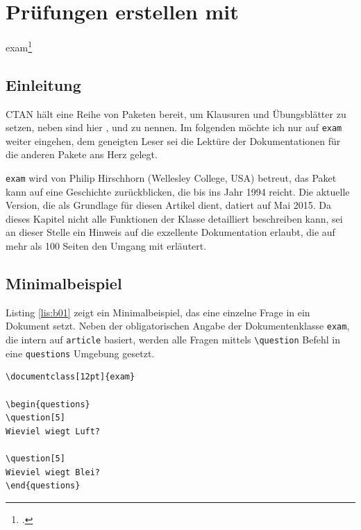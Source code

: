 \chapter{Prüfungen erstellen mit \protect{}}

exam\footcite{ziegenhagen:dtk2016/2}

\section{Einleitung}

CTAN hält eine Reihe von Paketen bereit, um Klausuren und Übungsblätter zu setzen, neben  sind hier ,  und  zu nennen. 
Im folgenden möchte ich nur auf \texttt{exam} weiter eingehen, dem geneigten Leser sei die Lektüre der Dokumentationen für die anderen Pakete ans Herz gelegt.

\texttt{exam} wird von Philip Hirschhorn (Wellesley College, USA) betreut, das Paket kann auf eine Geschichte zurückblicken, die bis ins Jahr 1994 reicht. 
Die aktuelle Version, die als Grundlage für diesen Artikel dient, datiert auf Mai 2015. 
Da dieses Kapitel nicht alle Funktionen der Klasse detailliert beschreiben kann, sei an dieser Stelle ein Hinweis auf die exzellente Dokumentation erlaubt, die auf mehr als 100 Seiten den Umgang mit  erläutert.

\section{Minimalbeispiel}

Listing \ref{lis:b01} zeigt ein Minimalbeispiel, das eine einzelne Frage in ein Dokument setzt. 
Neben der obligatorischen Angabe der Dokumentenklasse \texttt{exam}, die intern auf \texttt{article} basiert, werden alle Fragen mittels \texttt{\textbackslash question} Befehl in eine \texttt{questions} Umgebung gesetzt. 

\begin{lstlisting}[caption={Minimalbeispiel \texttt{beispiel-01.tex}},label={lis:b01}]
\documentclass[12pt]{exam}

\begin{questions}
\question[5]
Wieviel wiegt Luft?

\question[5]
Wieviel wiegt Blei?
\end{questions}

\end{lstlisting}

